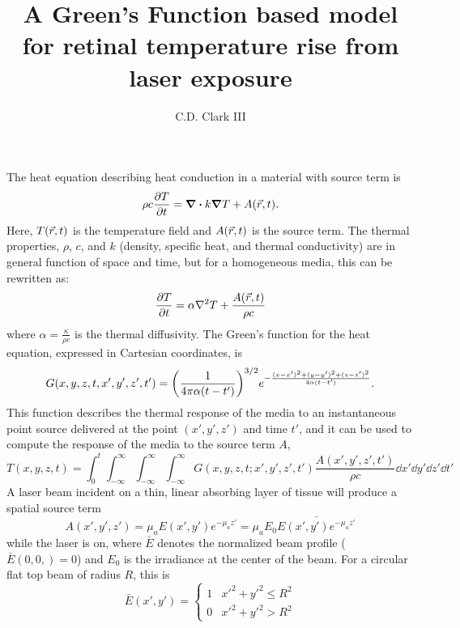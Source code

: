 \documentclass[]{article}
\author{C.D. Clark III}
\title{A Green's Function based model for retinal temperature rise from laser exposure}
\begin{document}
\maketitle

The heat equation describing heat conduction in a material with source term is
\begin{equation*}
    \rho c \pdv{T}{t} = \div{k\grad T} + A(\vec{r},t).
\end{equation*}
Here, $T\qty(\vec{r},t)$ is the temperature field and $A\qty(\vec{r},t)$ is the
source term. The thermal properties, $\rho$, $c$, and $k$ (density, specific
heat, and thermal conductivity) are in general function of space and time, but
for a homogeneous media, this can be rewritten as:
\begin{equation*}
    \pdv{T}{t} = \alpha\laplacian{T} + \frac{A(\vec{r},t)}{\rho c}
\end{equation*}
where $\alpha = \frac{\kappa}{\rho c }$ is the thermal diffusivity.
The Green's function for the heat equation, expressed in Cartesian coordinates, is
\begin{equation*}
    G(x,y,z,t,x',y',z',t') = \qty(\frac{1}{4\pi \alpha (t-t')})^{3/2} e^{-\frac{(x-x')^2+(y-y')^2+(z-z')^2}{4\alpha(t-t')}}.
\end{equation*}
This function describes the thermal response of the media to an instantaneous
point source delivered at the point $(x',y',z')$ and time $t'$, and it can
be used to compute the response of the media to the source term $A$,
\begin{equation*}
  T(x,y,z,t) = \int_0^t \int_{-\infty}^{\infty} \int_{-\infty}^{\infty} \int_{-\infty}^{\infty} G(x,y,z,t;x',y',z',t') \frac{A(x',y',z',t')}{\rho c} \dd x' \dd y' \dd z' \dd t'
\end{equation*}
A laser beam incident on a thin, linear absorbing layer of tissue will produce a spatial source term
\begin{equation*}
    A(x',y',z') = \mu_a E(x',y') e^{-\mu_a z'} = \mu_a E_0 \bar{E(x',y') e^{-\mu_a z'}}
\end{equation*}
while the laser is on,
where $\bar{E}$ denotes the normalized beam profile ($\bar{E}(0,0,) = 0$) and $E_0$ is the irradiance at the center of the beam.
For a circular flat top beam of radius $R$, this is
\begin{equation*}
    \bar{E}(x',y') = \begin{cases}
        1 & x'^2 + y'^2 \le R^2 \\
        0 & x'^2 + y'^2 > R^2
    \end{cases}
\end{equation*}
\end{document}
